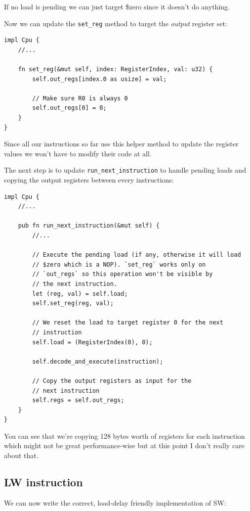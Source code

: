 \documentclass[a4paper]{article}
\newcommand{\code}[1] {\texttt{#1}}
\begin{document}
If no load is pending we can just target \$zero since it doesn't do
anything.

Now we can update the \code{set\_reg} method to target the
\emph{output} register set:

\begin{lstlisting}
impl Cpu {
    //...

    fn set_reg(&mut self, index: RegisterIndex, val: u32) {
        self.out_regs[index.0 as usize] = val;

        // Make sure R0 is always 0
        self.out_regs[0] = 0;
    }
}
\end{lstlisting}

Since all our instructions so far use this helper method to update the
register values we won't have to modify their code at all.

The next step is to update \code{run\_next\_instruction} to handle
pending loads and copying the output registers between every
instructions:

\begin{lstlisting}
impl Cpu {
    //...

    pub fn run_next_instruction(&mut self) {
        //...

        // Execute the pending load (if any, otherwise it will load
        // $zero which is a NOP). `set_reg` works only on
        // `out_regs` so this operation won't be visible by
        // the next instruction.
        let (reg, val) = self.load;
        self.set_reg(reg, val);

        // We reset the load to target register 0 for the next
        // instruction
        self.load = (RegisterIndex(0), 0);

        self.decode_and_execute(instruction);

        // Copy the output registers as input for the
        // next instruction
        self.regs = self.out_regs;
    }
}
\end{lstlisting}

You can see that we're copying 128 bytes worth of registers for each
instruction which might not be great performance-wise but at this
point I don't really care about that.

\subsection{LW instruction}

We can now write the correct, load-delay friendly implementation of
SW:
\end{document}
